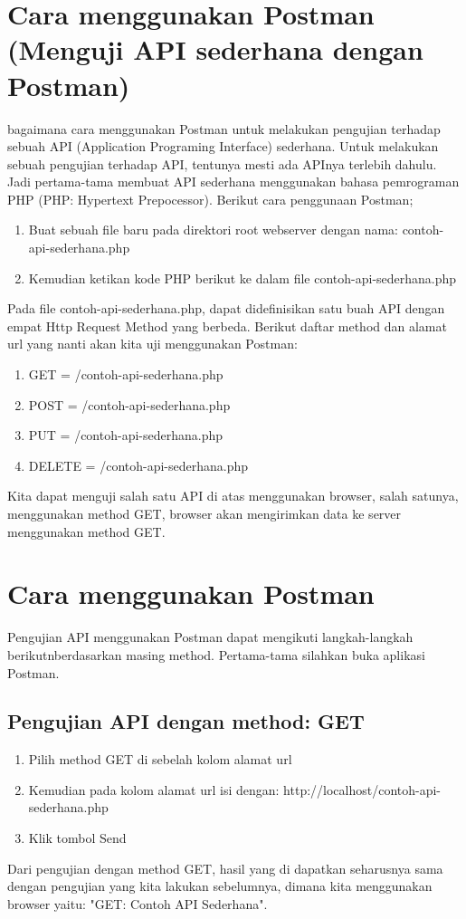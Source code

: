 \documentclass[12pt,a4paper]{article}
\begin{document}
\section{Cara menggunakan Postman (Menguji API sederhana dengan Postman)}
bagaimana cara menggunakan Postman untuk melakukan pengujian terhadap sebuah API (Application Programing Interface) sederhana.
Untuk melakukan sebuah pengujian terhadap API, tentunya mesti ada APInya terlebih dahulu. Jadi pertama-tama membuat API sederhana menggunakan bahasa pemrograman PHP (PHP: Hypertext Prepocessor).
Berikut cara penggunaan Postman; 
\begin{enumerate}
\item Buat sebuah file baru pada direktori root webserver dengan nama: contoh-api-sederhana.php 
\item Kemudian ketikan kode PHP berikut ke dalam file contoh-api-sederhana.php
\end{enumerate}
Pada file contoh-api-sederhana.php, dapat didefinisikan satu buah API dengan empat Http Request Method yang berbeda. Berikut daftar method dan alamat url yang nanti akan kita uji menggunakan Postman:
\begin{enumerate}
\item GET = /contoh-api-sederhana.php
\item POST = /contoh-api-sederhana.php
\item PUT = /contoh-api-sederhana.php
\item DELETE = /contoh-api-sederhana.php
\end{enumerate}
Kita dapat menguji salah satu API di atas menggunakan browser, salah satunya, menggunakan method GET, browser akan mengirimkan data ke server menggunakan method GET.
\section{Cara menggunakan Postman}
Pengujian API menggunakan Postman dapat mengikuti langkah-langkah berikutnberdasarkan masing method. Pertama-tama silahkan buka aplikasi Postman.
\subsection{Pengujian API dengan method: GET}
\begin{enumerate}
\item Pilih method GET di sebelah kolom alamat url
\item Kemudian pada kolom alamat url isi dengan: http://localhost/contoh-api-sederhana.php
\item Klik tombol Send
\end{enumerate}
Dari pengujian dengan method GET, hasil yang di dapatkan seharusnya sama dengan pengujian yang kita lakukan sebelumnya, dimana kita menggunakan browser yaitu: "GET: Contoh API Sederhana".
\end{document}

